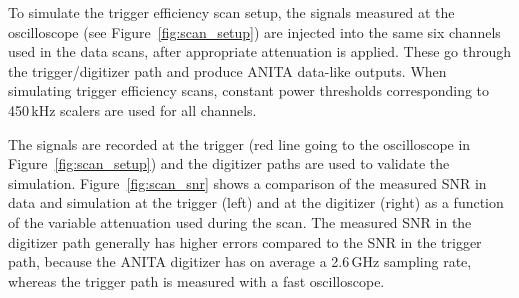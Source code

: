 
To simulate the trigger efficiency scan setup, the signals
measured at the oscilloscope (see Figure~\ref{fig:scan_setup}) are
injected into the same six channels used in the data scans, after
appropriate attenuation is applied.
These go through the trigger/digitizer path and produce ANITA
data-like outputs.
When simulating trigger efficiency scans, constant power
thresholds corresponding to 450\,kHz scalers are used for all channels.

The signals are recorded at the trigger (red line going to the
oscilloscope in Figure~\ref{fig:scan_setup}) and the digitizer paths
are used to validate the simulation.
Figure~\ref{fig:scan_snr} shows a comparison of the measured SNR in
data and simulation at the trigger (left) and at
the digitizer (right) as a function of the variable attenuation used
during the scan.
The measured SNR in the digitizer path generally has higher errors compared to the SNR in the trigger path, because the ANITA digitizer has on average a
2.6\,GHz sampling rate, whereas the trigger path is measured with a
fast oscilloscope. 

